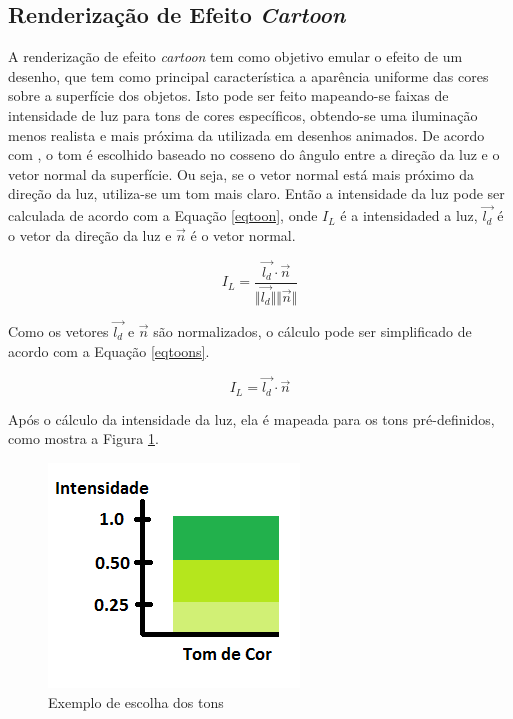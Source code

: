 {	\subsection{Renderização de Efeito \textit{Cartoon}}
	\label{cartoon}

	A renderização de efeito \textit{cartoon} tem como objetivo emular o efeito de um desenho, que tem como principal característica a aparência uniforme das cores sobre a superfície dos objetos. Isto pode ser feito mapeando-se faixas de intensidade de luz para tons de cores específicos, obtendo-se uma iluminação menos realista e mais próxima da utilizada em desenhos animados. De acordo com \cite{sbgames}, o tom é escolhido baseado no cosseno do ângulo entre a direção da luz e o vetor normal da superfície. Ou seja, se o vetor normal está mais próximo da direção da luz, utiliza-se um tom mais claro.  Então a intensidade da luz pode ser calculada de acordo com a Equação \ref{eqtoon}, onde $I_L$ é a intensidaded a luz, $\vec{l_{d}}$ é o vetor da direção da luz e $\vec{n}$ é o vetor normal.

	\begin{equation}
		I_ {L} = \frac{ \vec{l_{d}} \cdot \vec{n} } {\Vert \vec{l_{d}} \Vert  \Vert \vec{n} \Vert } 
	\label{eqtoon}
	\end{equation}

	Como os vetores $\vec{l_{d}}$ e $\vec{n}$ são normalizados, o cálculo pode ser simplificado de acordo com a Equação \ref{eqtoons}.

	\begin{equation}
		I_ {L} =  \vec{l_{d}} \cdot \vec{n}  
	\label{eqtoons}
	\end{equation}

	Após o cálculo da intensidade da luz, ela é mapeada para os tons pré-definidos, como mostra a Figura \ref{tons}.

	\begin{figure}[ht]
	\centering
		\includegraphics[keepaspectratio=true,scale=1.0]{figuras/tomcor.png}
	\caption{Exemplo de escolha dos tons}
	\label{tons}
	\end{figure}

}

